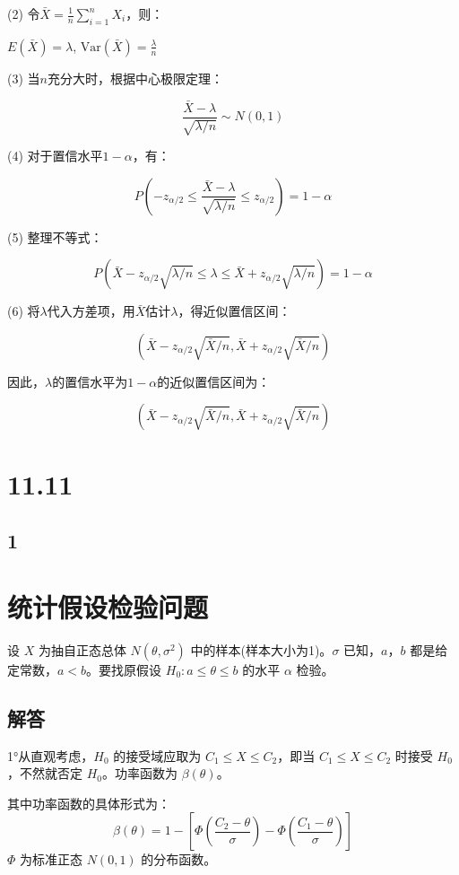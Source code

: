 \documentclass[UTF8]{report}
\theoremstyle{MyLineTheoremStyle} %
\theoremstyle{MyBlockTheoremStyle} %
\theoremstyle{MySubsubsectionStyle} %
\begin{document}
(2) 令$\bar{X}=\frac{1}{n}\sum_{i=1}^n X_i$，则：

$E(\bar{X})=\lambda$, $\text{Var}(\bar{X})=\frac{\lambda}{n}$

(3) 当$n$充分大时，根据中心极限定理：

$$\frac{\bar{X}-\lambda}{\sqrt{\lambda/n}} \sim N(0,1)$$

(4) 对于置信水平$1-\alpha$，有：

$$P(-z_{\alpha/2} \leq \frac{\bar{X}-\lambda}{\sqrt{\lambda/n}} \leq z_{\alpha/2})=1-\alpha$$

(5) 整理不等式：

$$P(\bar{X}-z_{\alpha/2}\sqrt{\lambda/n} \leq \lambda \leq \bar{X}+z_{\alpha/2}\sqrt{\lambda/n})=1-\alpha$$

(6) 将$\lambda$代入方差项，用$\bar{X}$估计$\lambda$，得近似置信区间：

$$(\bar{X}-z_{\alpha/2}\sqrt{\bar{X}/n}, \bar{X}+z_{\alpha/2}\sqrt{\bar{X}/n})$$

因此，$\lambda$的置信水平为$1-\alpha$的近似置信区间为：

$$(\bar{X}-z_{\alpha/2}\sqrt{\bar{X}/n}, \bar{X}+z_{\alpha/2}\sqrt{\bar{X}/n})$$





\section{11.11}

\subsection{1}

\section*{统计假设检验问题}

设 $X$ 为抽自正态总体 $N(\theta,\sigma^2)$ 中的样本(样本大小为1)。$\sigma$ 已知，$a$，$b$ 都是给定常数，$a<b$。要找原假设 $H_0: a\leq\theta\leq b$ 的水平 $\alpha$ 检验。

\subsection*{解答}

1°从直观考虑，$H_0$ 的接受域应取为 $C_1\leq X\leq C_2$，即当 $C_1\leq X\leq C_2$ 时接受 $H_0$，不然就否定 $H_0$。功率函数为 $\beta(\theta)$。

其中功率函数的具体形式为：
$$\beta(\theta)=1-\left[\Phi\left(\frac{C_2-\theta}{\sigma}\right)-\Phi\left(\frac{C_1-\theta}{\sigma}\right)\right]$$
$\Phi$ 为标准正态 $N(0,1)$ 的分布函数。
\end{document}
